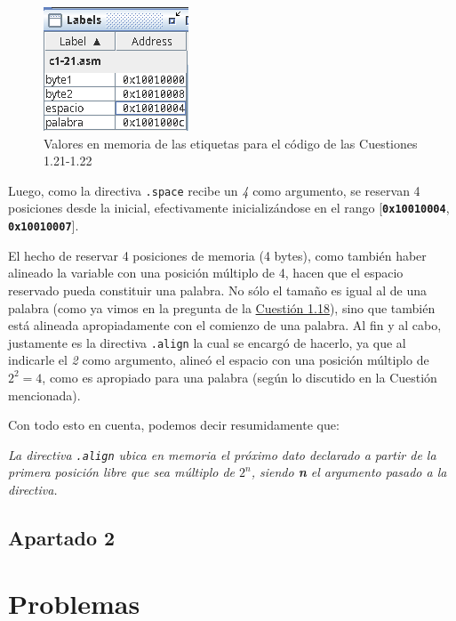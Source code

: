 \documentclass[a4paper]{report}
\begin{document}
\begin{figure}[h]
    \centering
    \captionsetup{justification = centering}
    \includegraphics[width=.25\linewidth]{img/c1-21}
    \caption{Valores en memoria de las etiquetas para el código de las Cuestiones 1.21-1.22}
    \label{fig:c1-21-labels}
\end{figure}

Luego, como la directiva \texttt{.space} recibe un \textit{4} como argumento, se reservan 4 posiciones desde la inicial, efectivamente inicializándose en el rango [\texttt{\textbf{0x10010004}}, \texttt{\textbf{0x10010007}}].

El hecho de reservar 4 posiciones de memoria (4 bytes), como también haber alineado la variable con una posición múltiplo de 4, hacen que el espacio reservado pueda constituir una palabra. No sólo el tamaño es igual al de una palabra (como ya vimos en la pregunta de la \hyperref[sec:c1-18]{Cuestión 1.18}), sino que también está alineada apropiadamente con el comienzo de una palabra. Al fin y al cabo, justamente es la directiva \texttt{.align} la cual se encargó de hacerlo, ya que al indicarle el \textit{2} como argumento, alineó el espacio con una posición múltiplo de $2^2 = 4$, como es apropiado para una palabra (según lo discutido en la Cuestión mencionada).

Con todo esto en cuenta, podemos decir resumidamente que:

\begin{center}
    \textit{La directiva \texttt{.align} ubica en memoria el próximo dato declarado a partir de la primera posición libre que sea múltiplo de $2^n$, siendo \textbf{n} el argumento pasado a la directiva.}
\end{center}

\section{Apartado 2}



\chapter{Problemas}
\end{document}
